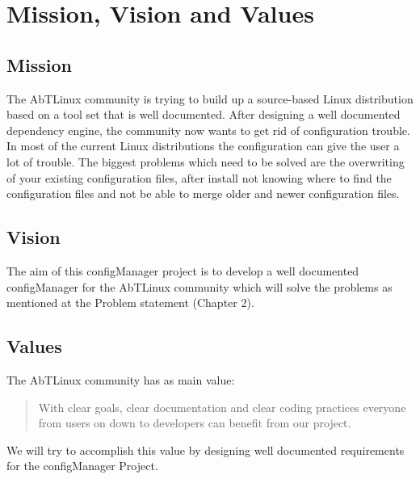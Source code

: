 \newpage

\section{Mission, Vision and Values}

\subsection{Mission}

The AbTLinux community is trying to build up a source-based Linux distribution based on a tool set that is well documented. After designing a well documented dependency engine, the community now wants to get rid of configuration trouble. In most of the current Linux distributions the configuration can give the user a lot of trouble. The biggest problems which need to be solved are the overwriting of your existing configuration files, after install not knowing where to find the configuration files and not be able to merge older and newer configuration files.

\subsection{Vision}

The aim of this configManager project is to develop a well documented configManager for the AbTLinux community which will solve the problems as mentioned at the Problem statement (Chapter 2).

\subsection{Values}

The AbTLinux community has as main value:
\begin{quote}
With clear goals, clear documentation and clear coding practices everyone from users on down to developers can benefit from our project.
\end{quote}
We will try to accomplish this value by designing well documented requirements for the configManager Project.